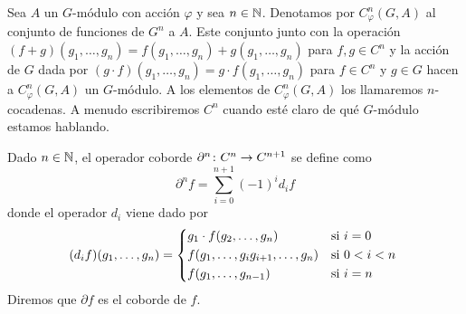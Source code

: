 
\begin{definicion}
	Sea $A$ un $G$-módulo con acción $\varphi$ y sea $n\in \mathbb{N}$. Denotamos por $C^n_\varphi(G,A)$ al conjunto de funciones de $G^n$ a $A$. Este conjunto junto con la operación $(f+g)(g_1,\ldots,g_n) = f(g_1,\ldots,g_n) + g(g_1,\ldots,g_n)$ para $f,g\in C^n$ y la acción de $G$ dada por $(g\cdot f)(g_1,\ldots,g_n) = g\cdot f(g_1,\ldots,g_n)$ para $f\in C^n$ y $g\in G$ hacen a $C^n_\varphi(G,A)$ un $G$-módulo. %
	A los elementos de $C^n_\varphi(G,A)$ los llamaremos $n$-cocadenas. A menudo escribiremos $C^n$ cuando esté claro de qué $G$-módulo estamos hablando. %

\end{definicion}


\begin{definicion}
	Dado $n\in \mathbb{N}$, el operador coborde $\partial^n\colon C^n\to C^{n+1}$ se define como
	\begin{equation*}
		\partial^n f = \sum\limits_{i=0}^{n+1} (-1)^{i} d_i f
	\end{equation*}
	donde el operador $d_i$ viene dado por 
	\[
		(d_if)(g_1,\ldots,g_n) = 
		\begin{cases*} %
			g_1\cdot f(g_2,\ldots,g_n) 				& si $ i=0$ \\
			f(g_1,\ldots,g_ig_{i+1},\ldots,g_n) 	& si $ 0 < i <n$ \\ %
			f(g_1,\ldots,g_{n-1}) 					& si $ i=n$
		\end{cases*}
	\]
	Diremos que $\partial f$ es el coborde de $f$. %
\end{definicion}


